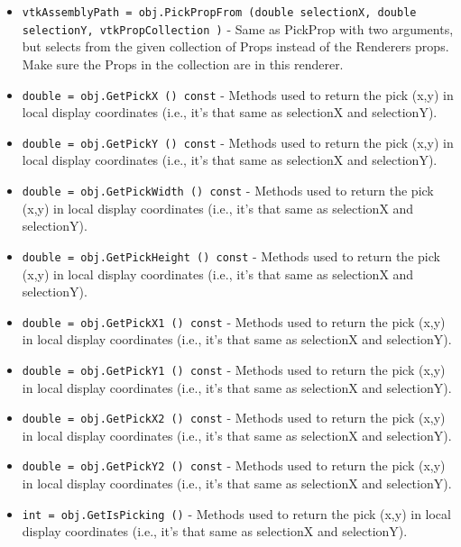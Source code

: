\begin{itemize}
\item  \verb|vtkAssemblyPath = obj.PickPropFrom (double selectionX, double selectionY, vtkPropCollection )| -  Same as PickProp with two arguments, but selects from the given
 collection of Props instead of the Renderers props.  Make sure
 the Props in the collection are in this renderer.

\item  \verb|double = obj.GetPickX () const| -  Methods used to return the pick (x,y) in local display coordinates (i.e.,
 it's that same as selectionX and selectionY).

\item  \verb|double = obj.GetPickY () const| -  Methods used to return the pick (x,y) in local display coordinates (i.e.,
 it's that same as selectionX and selectionY).

\item  \verb|double = obj.GetPickWidth () const| -  Methods used to return the pick (x,y) in local display coordinates (i.e.,
 it's that same as selectionX and selectionY).

\item  \verb|double = obj.GetPickHeight () const| -  Methods used to return the pick (x,y) in local display coordinates (i.e.,
 it's that same as selectionX and selectionY).

\item  \verb|double = obj.GetPickX1 () const| -  Methods used to return the pick (x,y) in local display coordinates (i.e.,
 it's that same as selectionX and selectionY).

\item  \verb|double = obj.GetPickY1 () const| -  Methods used to return the pick (x,y) in local display coordinates (i.e.,
 it's that same as selectionX and selectionY).

\item  \verb|double = obj.GetPickX2 () const| -  Methods used to return the pick (x,y) in local display coordinates (i.e.,
 it's that same as selectionX and selectionY).

\item  \verb|double = obj.GetPickY2 () const| -  Methods used to return the pick (x,y) in local display coordinates (i.e.,
 it's that same as selectionX and selectionY).

\item  \verb|int = obj.GetIsPicking ()| -  Methods used to return the pick (x,y) in local display coordinates (i.e.,
 it's that same as selectionX and selectionY).


\end{itemize}
